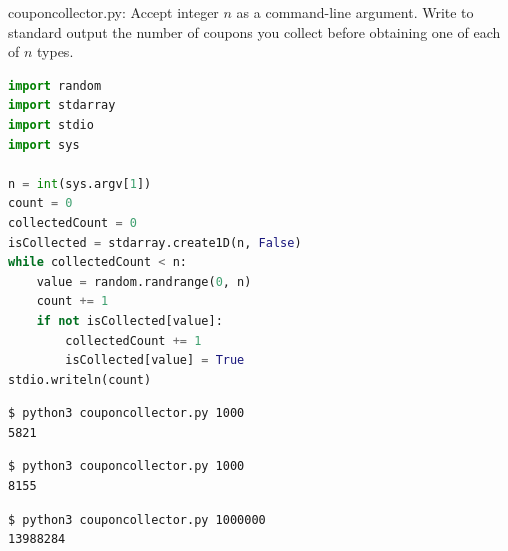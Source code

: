 \documentclass[8pt,a4paper,compress]{beamer}
\begin{document}
\begin{frame}[fragile]
\pause

\begin{framed}
\tiny couponcollector.py: Accept integer $n$ as a command-line argument. Write to standard output the number of coupons you collect before obtaining one of each of $n$ types.
\end{framed}

\begin{lstlisting}[language=Python,style=focusin]
import random
import stdarray
import stdio
import sys

n = int(sys.argv[1])
count = 0
collectedCount = 0
isCollected = stdarray.create1D(n, False)
while collectedCount < n:
    value = random.randrange(0, n)
    count += 1
    if not isCollected[value]:
        collectedCount += 1
        isCollected[value] = True
stdio.writeln(count)
\end{lstlisting}

\pause\bigskip

\begin{lstlisting}[language={},style=focusin]
$ python3 couponcollector.py 1000
5821
\end{lstlisting}

\pause\bigskip

\begin{lstlisting}[language={},style=focusin]
$ python3 couponcollector.py 1000
8155
\end{lstlisting}

\pause\bigskip

\begin{lstlisting}[language={},style=focusin]
$ python3 couponcollector.py 1000000
13988284
\end{lstlisting}
\end{frame}
\end{document}

